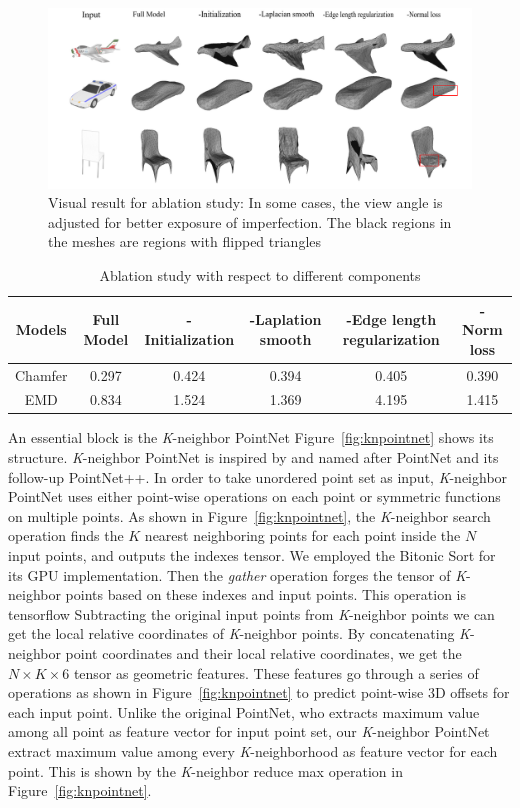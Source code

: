 \begin{figure}[htbp]
	\centering
	\includegraphics[width=\linewidth]{img/abl/abl}
	\caption{Visual result for ablation study: In some cases, the view angle is adjusted for better exposure of imperfection. The black regions in the meshes are regions with flipped triangles}
	\label{fig:abl}
\end{figure}

\begin{table}
	\caption{Ablation study with respect to different components}
	\label{tab:ablation}
	\centering
	\begin{tabular}{c | c c c c c}
		Models &  Full Model  & -Initialization & -Laplation smooth & -Edge length regularization & -Norm loss \\
		\hline
		Chamfer      & 0.297 & 0.424 & 0.394 & 0.405  & 0.390\\
		EMD			 & 0.834 & 1.524 & 1.369 & 4.195  & 1.415
	\end{tabular}
\end{table}

An essential block is the \textit{K}-neighbor PointNet 
%
Figure~\ref{fig:knpointnet} shows its structure. 
\textit{K}-neighbor PointNet is inspired by and named after PointNet\cite{PointNet} and its follow-up PointNet++\cite{NIPS2017_7095}. 
%
In order to take unordered point set as input, \textit{K}-neighbor PointNet uses either point-wise operations on each point or symmetric functions on multiple points. 
As shown in Figure~\ref{fig:knpointnet}, the \textit{K}-neighbor search operation finds the $K$ nearest neighboring points for each point inside the $N$ input points, and outputs the indexes tensor. 
We employed the Bitonic Sort\cite{bitonicsorter} for its GPU implementation. 
Then the \emph{gather} operation forges the tensor of \textit{K}-neighbor points based on these indexes and input points. 
%
This operation is tensorflow 
Subtracting the original input points from \textit{K}-neighbor points we can get the local relative coordinates of \textit{K}-neighbor points. 
By concatenating \textit{K}-neighbor point coordinates and their local relative coordinates, we get the $N\times K\times6$ tensor as geometric features. 
%
These features go through a series of operations as shown in Figure~\ref{fig:knpointnet} to predict point-wise 3D offsets for each input point. Unlike the original PointNet\cite{PointNet}, who extracts maximum value among all point as feature vector for input point set, our \textit{K}-neighbor PointNet extract maximum value among every \textit{K}-neighborhood as feature vector for each point. This is shown by the \textit{K}-neighbor reduce max operation in Figure~\ref{fig:knpointnet}.

